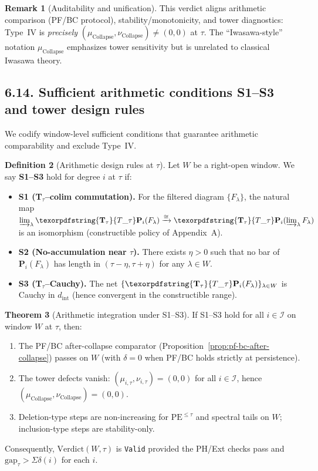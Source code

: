 \documentclass[11pt]{article}
\numberwithin{equation}{section}
\theoremstyle{plain}
\theoremstyle{definition}
\theoremstyle{remark}
\DeclareRobustCommand{\hyp}{\nobreakdash-}
\theoremstyle{plain}
\theoremstyle{definition}
\numberwithin{equation}{section}
\newtheorem{theorem}{Theorem}[section]
\theoremstyle{definition}
\newtheorem{definition}[theorem]{Definition}
\newtheorem{remark}[theorem]{Remark}
\DeclareRobustCommand{\Ttau}{\texorpdfstring{\ensuremath{\mathbf{T}_{\tau}}}{T\_\tau}}
\DeclareRobustCommand{\muc}{\mu_{\mathrm{Collapse}}}
\DeclareRobustCommand{\nuc}{\nu_{\mathrm{Collapse}}}
\numberwithin{equation}{section}
\theoremstyle{plain}
\theoremstyle{definition}
\theoremstyle{remark}
\providecommand{\Tfun}[1]{\mathbf{T}_{#1}}
\providecommand{\Ttau}{\Tfun{\tau}}
\providecommand{\muc}{\mu_{\mathrm{Collapse}}}
\providecommand{\nuc}{\nu_{\mathrm{Collapse}}}
\begin{document}
\begin{remark}[Auditability and unification]
This verdict aligns arithmetic comparison (PF/BC protocol), stability/monotonicity, and tower diagnostics: Type~IV is \emph{precisely} \((\muc,\nuc)\neq(0,0)\) at \(\tau\). The “Iwasawa\hyp style” notation \(\mu_{\mathrm{Collapse}}\) emphasizes tower sensitivity but is unrelated to classical Iwasawa theory.
\end{remark}

\subsection*{6.14. Sufficient arithmetic conditions S1–S3 and tower design rules}
We codify window\hyp level sufficient conditions that guarantee arithmetic comparability and exclude Type~IV.

\begin{definition}[Arithmetic design rules at \texorpdfstring{\(\tau\)}{tau}]\label{def:S123}
Let \(W\) be a right\hyp open window. We say \textbf{S1–S3} hold for degree \(i\) at \(\tau\) if:
\begin{itemize}
  \item \textbf{S1 (T\texorpdfstring{\(_\tau\)}{tau}–colim commutation).} For the filtered diagram \(\{F_\lambda\}\), the natural map
  \(\varinjlim_\lambda \Ttau\mathbf{P}_i(F_\lambda)\xrightarrow{\cong}\Ttau\mathbf{P}_i(\varinjlim_\lambda F_\lambda)\) is an isomorphism (constructible policy of Appendix~A).
  \item \textbf{S2 (No\hyp accumulation near \texorpdfstring{\(\tau\)}{tau}).} There exists \(\eta>0\) such that no bar of \(\mathbf{P}_i(F_\lambda)\) has length in \((\tau-\eta,\tau+\eta)\) for any \(\lambda\in W\).
  \item \textbf{S3 (T\texorpdfstring{\(_\tau\)}{tau}–Cauchy).} The net \(\{\Ttau\mathbf{P}_i(F_\lambda)\}_{\lambda\in W}\) is Cauchy in \(d_{\mathrm{int}}\) (hence convergent in the constructible range).
\end{itemize}
\end{definition}

\begin{theorem}[Arithmetic integration under S1–S3]\label{thm:S123}
If \textup{S1–S3} hold for all \(i\in\mathcal{I}\) on window \(W\) at \(\tau\), then:
\begin{enumerate}
  \item The PF/BC after\hyp collapse comparator (Proposition~\ref{prop:pf-bc-after-collapse}) passes on \(W\) (with \(\delta=0\) when PF/BC holds strictly at persistence).
  \item The tower defects vanish: \((\mu_{i,\tau},\nu_{i,\tau})=(0,0)\) for all \(i\in\mathcal{I}\), hence \((\muc,\nuc)=(0,0)\).
  \item Deletion\hyp type steps are non\hyp increasing for \(\mathrm{PE}^{\le\tau}\) and spectral tails on \(W\); inclusion\hyp type steps are stability\hyp only.
\end{enumerate}
Consequently, \(\mathrm{Verdict}(W,\tau)\) is \texttt{Valid} provided the PH/Ext checks pass and \(\mathrm{gap}_\tau>\Sigma\delta(i)\) for each \(i\).
\end{theorem}
\end{document}
